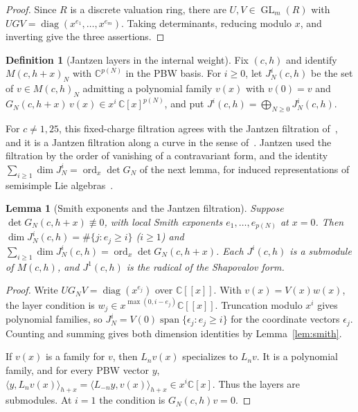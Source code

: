 \documentclass[twoside,10pt]{article}
\numberwithin{equation}{section}
\theoremstyle{slbody}
\newtheorem{lemma}[theorem]{Lemma}
\theoremstyle{definition}
\newtheorem{definition}[theorem]{Definition}
\theoremstyle{remark}
\newcommand{\ord}{\operatorname{ord}}
\begin{document}
\begin{proof}
Since \(R\) is a discrete valuation ring, there are
\(U,V\in\operatorname{GL}_m(R)\) with
\(UGV=\operatorname{diag}(x^{e_1},\ldots,x^{e_m})\).  Taking determinants,
reducing modulo \(x\), and inverting give the three assertions.
\end{proof}

\begin{definition}[Jantzen layers in the internal weight]
\label{def:jantzen-layers}
Fix \((c,h)\) and identify \(M(c,h+x)_N\) with \(\mathbb C^{p(N)}\) in the PBW
basis.  For \(i\geq0\), let \(J^i_N(c,h)\) be the set of \(v\in M(c,h)_N\)
admitting a polynomial family \(v(x)\) with \(v(0)=v\) and
\(G_N(c,h+x)\,v(x)\in x^i\,\mathbb C[x]^{p(N)}\), and put
\(J^i(c,h)=\bigoplus_{N\geq0}J^i_N(c,h)\).
\end{definition}

For \(c\neq1,25\), this fixed-charge filtration agrees with the Jantzen
filtration of~\cite[\S5.5, (5.49)]{IoharaKoga2011}, and it is a Jantzen
filtration along a curve in the sense of~\cite[\S4 and \S5.2]{Astashkevich1997}.
Jantzen used the filtration by the order of vanishing of a contravariant
form, and the identity \(\sum_{i\geq1}\dim J^i_N=\ord_x\det G_N\) of the next
lemma, for induced representations of semisimple Lie
algebras~\cite[\S2, Lemma~3]{Jantzen1977}.

\begin{lemma}[Smith exponents and the Jantzen filtration]
\label{lem:jantzen-smith}
Suppose \(\det G_N(c,h+x)\not\equiv0\), with local Smith exponents
\(e_1,\ldots,e_{p(N)}\) at \(x=0\).  Then
\(\dim J^i_N(c,h)=\#\{j:e_j\geq i\}\) (\(i\geq1\)) and
\(\sum_{i\geq1}\dim J^i_N(c,h)=\ord_x\det G_N(c,h+x)\).
Each \(J^i(c,h)\) is a submodule of \(M(c,h)\), and \(J^1(c,h)\) is the
radical of the Shapovalov form.
\end{lemma}

\begin{proof}
Write \(UG_NV=\operatorname{diag}(x^{e_j})\) over \(\mathbb C[[x]]\).
With \(v(x)=V(x)w(x)\), the layer condition is
\(w_j\in x^{\max(0,i-e_j)}\mathbb C[[x]]\). Truncation modulo \(x^i\)
gives polynomial families, so \(J^i_N=V(0)\operatorname{span}\{\epsilon_j:e_j\geq i\}\)
for the coordinate vectors \(\epsilon_j\). Counting and summing gives
both dimension identities by Lemma~\ref{lem:smith}.

If \(v(x)\) is a family for \(v\), then \(L_nv(x)\) specializes to
\(L_nv\). It is a polynomial family, and for every PBW vector \(y\),
\(\langle y,L_nv(x)\rangle_{h+x}=\langle L_{-n}y,v(x)\rangle_{h+x}\in
x^i\mathbb C[x]\). Thus the layers are submodules. At \(i=1\) the
condition is \(G_N(c,h)v=0\).
\end{proof}
\end{document}
